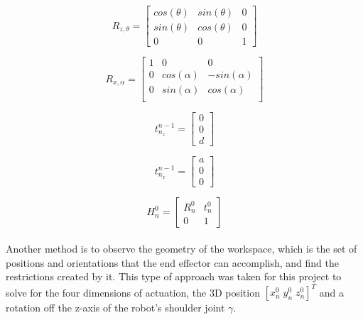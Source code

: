 \begin{equation}
	R_{z, \theta} = \left[\begin{array}{ccc}
		cos(\theta) & sin(\theta) & 0 \\
		sin(\theta) & cos(\theta) & 0 \\
		0 & 0 & 1
	\end{array}\right]
\label{sample_return_rover:robot_design:rz}
\end{equation}

\begin{equation}
	R_{x, \alpha} = \left[\begin{array}{ccc}
		1 & 0 & 0 \\
		0 & cos(\alpha) & -sin(\alpha) \\
		0 & sin(\alpha) &  cos(\alpha) \\
		\end{array}\right]
	\label{sample_return_rover:robot_design:rx}
\end{equation}

\begin{equation}
	t^{n-1}_{n_{z}} = \left[\begin{array}{c}
		0 \\
		0 \\
		d
	\end{array}\right]
	\label{sample_return_rover:robot_design:dz}
\end{equation}

\begin{equation}
	t^{n-1}_{n_{x}} = \left[\begin{array}{c}
		a \\
		0 \\
		0
	\end{array}\right]
	\label{sample_return_rover:robot_design:dx}
\end{equation}

\begin{equation}
	H^{0}_{n} = \left[\begin{array}{cc}
		R^{0}_{n} & t^{0}_{n} \\
	    0 & 1
	\end{array}\right]
\label{sample_return_rover:robot_design:H0n}
\end{equation} \\

Another method is to observe the geometry of the workspace, which is the set of positions and orientations that the end effector can accomplish, and find the restrictions created by it. This type of approach was taken for this project to solve for the four dimensions of actuation, the 3D position $\left[x^{0}_{n} \; y^{0}_{n}\; z^{0}_{n}\right]^{T}$ and a rotation off the z-axis of the robot's shoulder joint $\gamma$. \\

